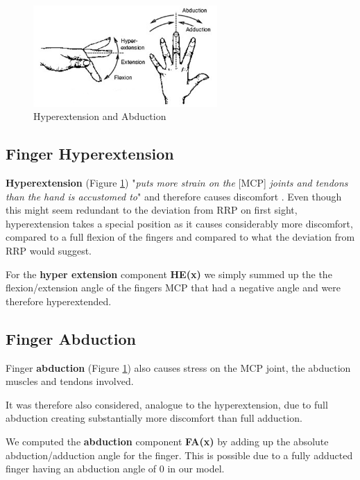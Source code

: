 \documentclass{sig-alternate-05-2015}
\begin{document}
\begin{figure}[b]
\centering
\includegraphics[width=7cm]{abduction}
\vspace{-20pt}
\caption{Hyperextension and Abduction}
\label{fig:hyperabduction}
\vspace{-10pt}
\end{figure}

\subsection{Finger Hyperextension}

\textbf{Hyperextension} (Figure \ref{fig:hyperabduction}) "\textit{puts more strain on the }[MCP] \textit{joints and tendons than the hand is accustomed to}" \cite{laviola1999survey} and therefore causes discomfort \cite{laviola1999survey}.
Even though this might seem redundant to the deviation from RRP on first sight, hyperextension takes a special position as it causes considerably more discomfort, compared to a full flexion of the fingers and compared to what the deviation from RRP would suggest.

For the \textbf{hyper extension} component \textbf{HE(x)} we simply summed up the the flexion/extension angle of the fingers MCP that had a negative angle and were therefore hyperextended.

\subsection{Finger Abduction}

Finger \textbf{abduction} (Figure \ref{fig:hyperabduction})
also causes stress on the MCP joint, the abduction muscles and tendons involved.

It was therefore also considered, analogue to the hyperextension, due to full abduction creating substantially more discomfort than full adduction.

We computed the \textbf{abduction} component \textbf{FA(x)} by adding up the absolute abduction/adduction angle for the finger. This is possible due to a fully adducted finger having an abduction angle of 0 in our model.
\end{document}

